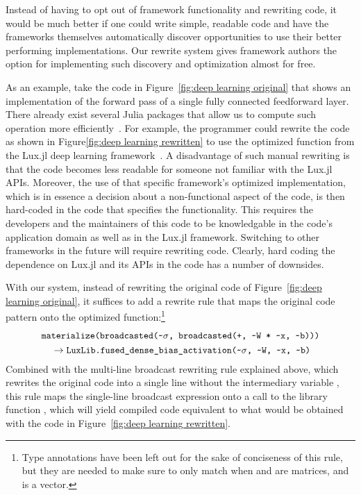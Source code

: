Instead of having to opt out of framework functionality and rewriting code, it would be much better if one could write simple, readable code and have the frameworks themselves automatically discover opportunities to use their better performing implementations. 
Our rewrite system gives framework authors the option for implementing such discovery and optimization almost for free.

As an example, take the code in Figure~\ref{fig:deep learning original} that shows an implementation of the forward pass of a single fully connected feedforward layer.
There already exist several Julia packages that allow us to compute such operation more efficiently~\cite{faingnaertFlexiblePerformantGEMM2022,innesFashionableModellingFlux2018,innesFluxElegantMachine2018}.
For example, the programmer could rewrite the code as shown in Figure\ref{fig:deep learning rewritten} to use the optimized  function from the Lux.jl deep learning framework~\cite{palLuxExplicitParameterization2023}. A disadvantage of such manual rewriting is that the code becomes less readable for someone not familiar with the Lux.jl APIs. Moreover, the use of that specific framework's optimized implementation, which is in essence a decision about a non-functional aspect of the code, is then hard-coded in the code that specifies the functionality. This requires the developers and the maintainers of this code to be knowledgable in the code's application domain as well as in the Lux.jl framework. Switching to other frameworks in the future will require rewriting code. Clearly, hard coding the dependence on Lux.jl and its APIs in the code has a number of downsides.

With our system, instead of rewriting the original code of Figure~\ref{fig:deep learning original}, it suffices to add a rewrite rule that maps the original code pattern onto the optimized  function:\footnote{Type annotations have been left out for the sake of conciseness of this rule, but they are needed to make sure to only match when  and  are matrices, and  is a vector.}
{
\begin{align*}
& \code{materialize(broadcasted(\char`\~$\sigma$, broadcasted(+, \char`\~W * \char`\~x, \char`\~b)))}
\\
&\quad\rightarrow \code{LuxLib.fused\_dense\_bias\_activation(\char`\~$\sigma$, \char`\~W, \char`\~x, \char`\~b)}
\end{align*}
}
Combined with the multi-line broadcast rewriting rule explained above, which rewrites the original code into a single line without the intermediary variable , this rule maps the single-line broadcast expression onto a call to the library function , which will yield compiled code equivalent to what would be obtained with the code in Figure~\ref{fig:deep learning rewritten}.

